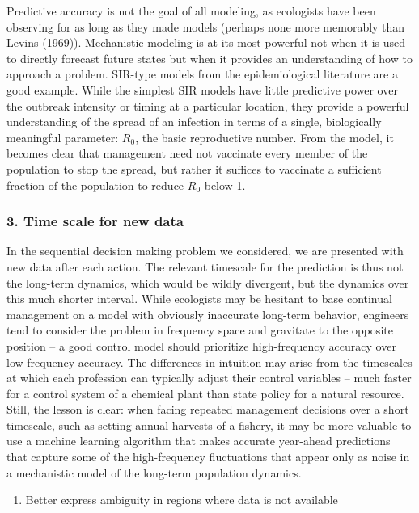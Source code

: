 \documentclass[author-year, review]{elsarticle} %
\begin{document}
Predictive accuracy is not the goal of all modeling, as ecologists have
been observing for as long as they made models (perhaps none more
memorably than Levins (1969)). Mechanistic modeling is at its most
powerful not when it is used to directly forecast future states but when
it provides an understanding of how to approach a problem. SIR-type
models from the epidemiological literature are a good example. While the
simplest SIR models have little predictive power over the outbreak
intensity or timing at a particular location, they provide a powerful
understanding of the spread of an infection in terms of a single,
biologically meaningful parameter: $R_0$, the basic reproductive number.
From the model, it becomes clear that management need not vaccinate
every member of the population to stop the spread, but rather it
suffices to vaccinate a sufficient fraction of the population to reduce
$R_0$ below 1.

\subsubsection{3. Time scale for new data}

In the sequential decision making problem we considered, we are
presented with new data after each action. The relevant timescale for
the prediction is thus not the long-term dynamics, which would be wildly
divergent, but the dynamics over this much shorter interval. While
ecologists may be hesitant to base continual management on a model with
obviously inaccurate long-term behavior, engineers tend to consider the
problem in frequency space and gravitate to the opposite position -- a
good control model should prioritize high-frequency accuracy over low
frequency accuracy. The differences in intuition may arise from the
timescales at which each profession can typically adjust their control
variables -- much faster for a control system of a chemical plant than
state policy for a natural resource. Still, the lesson is clear: when
facing repeated management decisions over a short timescale, such as
setting annual harvests of a fishery, it may be more valuable to use a
machine learning algorithm that makes accurate year-ahead predictions
that capture some of the high-frequency fluctuations that appear only as
noise in a mechanistic model of the long-term population dynamics.

\begin{enumerate}
\def\labelenumi{\arabic{enumi}.}
\setcounter{enumi}{1}
\itemsep1pt\parskip0pt
\item
  Better express ambiguity in regions where data is not available
\end{enumerate}
\end{document}

